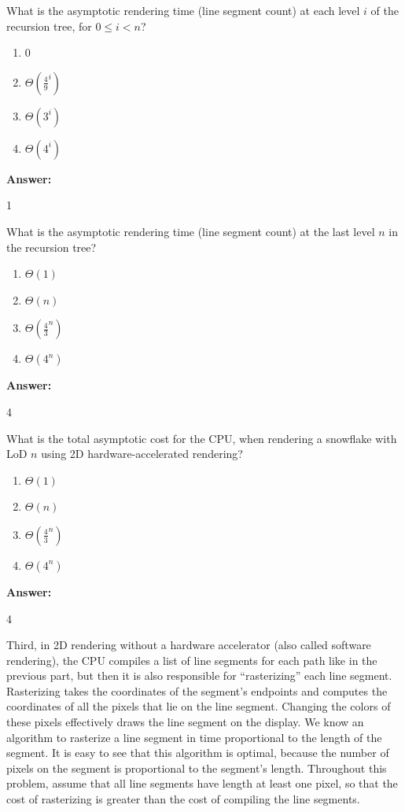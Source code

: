 \documentclass[12pt,twoside]{article}
\newcommand{\answer}{
 \par\medskip
 \textbf{Answer:}
}
\newcommand{\answerIj}{ \answer
1
}
\newcommand{\answerIk}{ \answer
4
}
\newcommand{\answerIl}{ \answer
4
}
\begin{document}
\begin{problems}
\begin{problemparts}
  \problempart {} What is the asymptotic rendering time (line segment count) at
  each level $i$ of the recursion tree, for $0 \le i < n$?
    \begin{enumerate}
      \item 0
      \item $\Theta(\frac{4}{9} ^ i)$
      \item $\Theta(3 ^ i)$
      \item $\Theta(4 ^ i)$
    \end{enumerate}
\answerIj

  \problempart {} What is the asymptotic rendering time (line segment count) at
  the last level $n$ in the recursion tree?
    \begin{enumerate}
      \item $\Theta(1)$
      \item $\Theta(n)$
      \item $\Theta(\frac{4}{3}^n)$
      \item $\Theta(4^n)$
    \end{enumerate}
\answerIk

  \problempart {} What is the total asymptotic cost for the CPU, when rendering
  a snowflake with LoD $n$ using 2D hardware-accelerated rendering?
    \begin{enumerate}
      \item $\Theta(1)$
      \item $\Theta(n)$
      \item $\Theta(\frac{4}{3}^n)$
      \item $\Theta(4^n)$
    \end{enumerate}
\answerIl

\end{problemparts}

Third, in 2D rendering without a hardware accelerator (also called
software rendering), the CPU compiles a list of line segments for each path like
in the previous part, but then it is also responsible for ``rasterizing'' each
line segment. Rasterizing takes the coordinates of the segment's endpoints and
computes the coordinates of all the pixels that lie on the line segment.
Changing the colors of these pixels effectively draws the line segment on the
display. We know an algorithm to rasterize a line segment in time proportional
to the length of the segment. It is easy to see that this algorithm is optimal,
because the number of pixels on the segment is proportional to the segment's
length. Throughout this problem, assume that all line segments have length
at least one pixel, so that the cost of rasterizing is greater than the cost
of compiling the line segments.


\end{problems}
\end{document}
